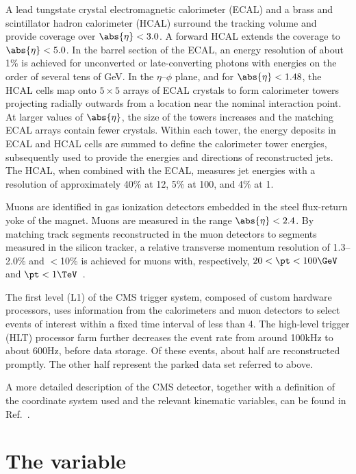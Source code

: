 A lead tungstate crystal electromagnetic calorimeter (ECAL) and a
brass and scintillator hadron calorimeter (HCAL) surround the tracking
volume and provide coverage over $\abs{\eta} < 3.0$. A forward HCAL
extends the coverage to $\abs{\eta} < 5.0$. In the barrel section of the
ECAL, an energy resolution of about 1\% is achieved for unconverted or
late-converting photons with energies on the order of several tens of
GeV. In the $\eta$--$\phi$ plane, and for $\abs{\eta}< 1.48$, the HCAL
cells map onto $5 \times 5$ arrays of ECAL crystals to form
calorimeter towers projecting radially outwards from a location near
the nominal interaction point. At larger values of $\abs{ \eta }$, the
size of the towers increases and the matching ECAL arrays contain
fewer crystals. Within each tower, the energy deposits in ECAL and
HCAL cells are summed to define the calorimeter tower energies,
subsequently used to provide the energies and directions of
reconstructed jets. The HCAL, when combined with the ECAL, measures
jet energies with a resolution of approximately 40\% at 12\GeV, 5\% at
100\GeV, and 4\% at 1\TeV.

Muons are identified in gas ionization detectors embedded in the steel
flux-return yoke of the magnet. Muons are measured in the range
$\abs{\eta}< 2.4$. By matching track segments reconstructed in the
muon detectors to segments measured in the silicon tracker, a relative
transverse momentum resolution of 1.3--2.0\% and $<$10\% is achieved
for muons with, respectively, $20 <\pt < 100\GeV$ and $\pt <
1\TeV$~\cite{Chatrchyan:2012xi}.

The first level (L1) of the CMS trigger system, composed of custom
hardware processors, uses information from the calorimeters and muon
detectors to select events of interest within a fixed time interval of
less than 4\mus. The high-level trigger (HLT) processor farm further
decreases the event rate from around 100\unit{kHz} to about
600\unit{Hz}, before data storage. Of these events, about half are
reconstructed promptly. The other half represent the parked data set
referred to above.

A more detailed description of the CMS detector, together with a
definition of the coordinate system used and the relevant kinematic
variables, can be found in Ref.~\cite{Chatrchyan:2008zzk}.


\section{The \texorpdfstring{\alphat}{AlphaT} variable\label{sec:alphat}}


